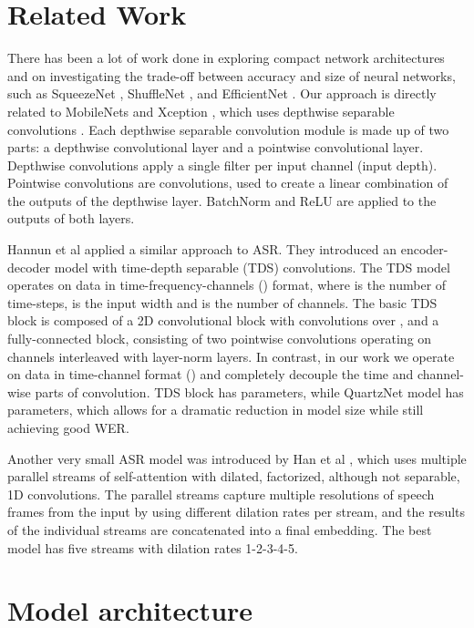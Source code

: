 \documentclass{article}
\begin{document}
\section{Related Work}
\label{sec:relatedwork}
There has been a lot of work done in exploring compact network architectures and on investigating the trade-off between accuracy and size of neural networks, such as SqueezeNet \cite{iandola2016}, ShuffleNet \cite{zhang2018}, and EfficientNet \cite{tan2019}.
Our approach is directly related to MobileNets \cite{howard2017, sandler2018} and Xception \cite{Chollet_2017}, which uses depthwise separable convolutions \cite{Sifre2014RigidMotionSF, vanhoucke2019}. Each depthwise separable convolution module is made up of two parts: a depthwise convolutional layer and a pointwise convolutional layer. Depthwise convolutions apply a single filter per input channel (input depth). Pointwise convolutions are   convolutions, used to create a linear combination of the outputs of the depthwise layer. BatchNorm and ReLU are applied to the outputs of both layers.

Hannun et al \cite{hannun2019} applied a similar approach to ASR. They introduced an encoder-decoder model with time-depth separable (TDS) convolutions. The TDS model operates on data in time-frequency-channels () format, where  is the number of time-steps,  is the input width and  is the number of channels.
The basic TDS block is composed of a 2D convolutional block with   convolutions over , and a fully-connected block, consisting of two  pointwise convolutions operating on  channels interleaved with layer-norm layers.  In contrast, in our work we operate on data in time-channel format () and completely decouple the time and channel-wise parts of convolution. TDS block has   parameters, while  QuartzNet model has  parameters, which allows for a dramatic reduction in model size while still achieving good WER.

Another very small ASR model  was introduced by Han et al \cite{han2019stateoftheart}, which uses multiple parallel streams of self-attention with dilated, factorized, although not separable, 1D convolutions. The parallel streams capture multiple resolutions of speech frames from the input by using different dilation rates per stream, and the results of the individual streams are concatenated into a final embedding. The best model has five streams with dilation rates 1-2-3-4-5. 
\section{Model architecture}
\label{sec:pagestyle}
\end{document}
